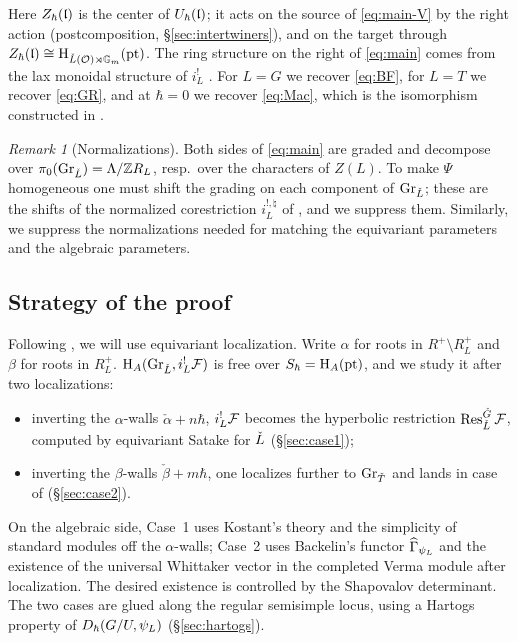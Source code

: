 \documentclass{article}
\theoremstyle{plain}
\theoremstyle{definition}
\theoremstyle{remark}
\newtheorem{remark}[theorem]{Remark}
\numberwithin{equation}{section}
\begin{document}
Here $Z_\hbar(\mathfrak{l})$ is the center of $U_\hbar(\mathfrak{l})$; it acts on the source of \eqref{eq:main-V} by the right action (postcomposition, \S\ref{sec:intertwiners}), and on the target through $Z_\hbar(\mathfrak{l})\cong\mathrm{H}_{\check{L}(\mathcal{O})\rtimes\mathbb{G}_m}(\mathrm{pt})$. The ring structure on the right of \eqref{eq:main} comes from the lax monoidal structure of $i_L^!$ \cite[\S2.2]{macerato2023leviequivariantrestrictionsphericalperverse}. For $L=G$ we recover \eqref{eq:BF}, for $L=T$ we recover \eqref{eq:GR}, and at $\hbar=0$ we recover \eqref{eq:Mac}, which is the isomorphism constructed in \cite{macerato2023leviequivariantrestrictionsphericalperverse}.

\begin{remark}[Normalizations]\label{rem:gradings}
Both sides of \eqref{eq:main} are graded and decompose over $\pi_0(\operatorname{Gr}_{\check{L}})=\Lambda/\mathbb{Z} R_L$, resp.\ over the characters of $Z(L)$. To make $\Psi$ homogeneous one must shift the grading on each component of $\operatorname{Gr}_{\check{L}}$; these are the shifts of the normalized corestriction $i_L^{!,\natural}$ of \cite[\S1.3]{macerato2023leviequivariantrestrictionsphericalperverse}, and we suppress them. Similarly, we suppress the normalizations needed for matching the equivariant parameters and the algebraic parameters.
\end{remark}

\subsection{Strategy of the proof}\label{sec:intro-strategy}
Following  \cite{ginzburg2014differentialoperatorsguaffine,macerato2023leviequivariantrestrictionsphericalperverse}, we will use equivariant localization. Write $\alpha$ for roots in $R^+\setminus R^+_L$ and $\beta$ for roots in $R^+_L$. $\mathrm{H}_A(\operatorname{Gr}_{\check{L}},i_L^!\mathcal{F})$ is free over $S_\hbar=\mathrm{H}_A(\mathrm{pt})$, and we study it after two localizations:
\begin{itemize}
\item[(1)] inverting the $\alpha$-walls $\check\alpha+n\hbar$, $i_L^!\mathcal{F}$ becomes the hyperbolic restriction $\operatorname{Res}^{{\check{G}}}_{\check{L}}\mathcal{F}$, computed by equivariant Satake for $\check{L}$ (\S\ref{sec:case1});
\item[(2)] inverting the $\beta$-walls $\check\beta+m\hbar$, one localizes further to $\operatorname{Gr}_{{\check{T}}}$ and lands in case of \cite{ginzburg2014differentialoperatorsguaffine} (\S\ref{sec:case2}).
\end{itemize}
On the algebraic side, Case~1 uses Kostant's theory and the simplicity of standard modules off the $\alpha$-walls; Case~2 uses Backelin's functor $\widehat\Gamma_{\psi_L}$ and the existence of the universal Whittaker vector in the completed Verma module after localization. The desired existence is controlled by the Shapovalov determinant. The two cases are glued along the regular semisimple locus, using a Hartogs property of $D_\hbar(G/U,\psi_L)$ (\S\ref{sec:hartogs}).
\end{document}
